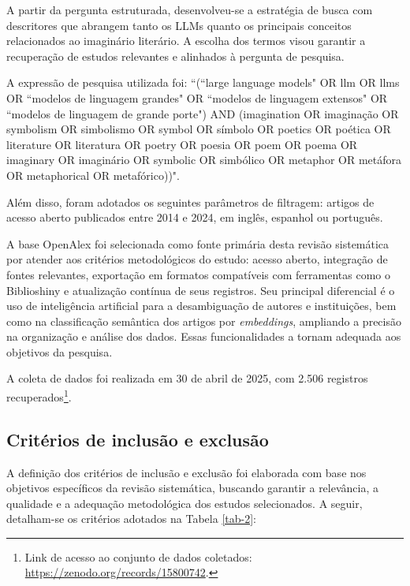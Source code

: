 \documentclass[portuguese]{textolivre}
\begin{document}
A partir da pergunta estruturada, desenvolveu-se a estratégia de busca com descritores que abrangem tanto os LLMs quanto os principais conceitos relacionados ao imaginário literário. A escolha dos termos visou garantir a recuperação de estudos relevantes e alinhados à pergunta de pesquisa.

A expressão de pesquisa utilizada foi: ``(``large language models" OR llm OR llms OR ``modelos de linguagem grandes" OR ``modelos de linguagem extensos" OR ``modelos de linguagem de grande porte") AND (imagination OR imaginação OR symbolism OR simbolismo OR symbol OR símbolo OR poetics OR poética OR literature OR literatura OR poetry OR poesia OR poem OR poema OR imaginary OR imaginário OR symbolic OR simbólico OR metaphor OR metáfora OR metaphorical OR metafórico))".

Além disso, foram adotados os seguintes parâmetros de filtragem: artigos de acesso aberto publicados entre 2014 e 2024, em inglês, espanhol ou português.

A base OpenAlex foi selecionada como fonte primária desta revisão sistemática por atender aos critérios metodológicos do estudo: acesso aberto, integração de fontes relevantes, exportação em formatos compatíveis com ferramentas como o Biblioshiny e atualização contínua de seus registros. Seu principal diferencial é o uso de inteligência artificial para a desambiguação de autores e instituições, bem como na classificação semântica dos artigos por \textit{embeddings}, ampliando a precisão na organização e análise dos dados. Essas funcionalidades a tornam adequada aos objetivos da pesquisa.

A coleta de dados foi realizada em 30 de abril de 2025, com 2.506 registros recuperados\footnote{Link de acesso ao conjunto de dados coletados: \url{https://zenodo.org/records/15800742}.}.

\subsection{Critérios de inclusão e exclusão}

A definição dos critérios de inclusão e exclusão foi elaborada com base nos objetivos específicos da revisão sistemática, buscando garantir a relevância, a qualidade e a adequação metodológica dos estudos selecionados. A seguir, detalham-se os critérios adotados na Tabela \ref{tab-2}:
\end{document}
